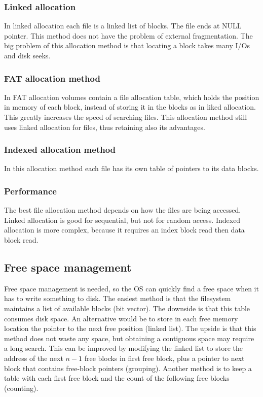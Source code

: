 
\subsubsection{Linked allocation}
In linked allocation each file is a linked list of blocks. The file ends at NULL pointer. This method does not have the problem of external fragmentation. The big problem of this allocation method is that locating a block takes many I/Os and disk seeks.


\subsubsection{FAT allocation method}
In FAT allocation volumes contain a file allocation table, which holds the position in memory of each block, instead of storing it in the blocks as in liked allocation. This greatly increases the speed of searching files. This allocation method still uses linked allocation for files, thus retaining also its advantages.

\subsubsection{Indexed allocation method}
In this allocation method each file has its own table of pointers to its data blocks.


\subsubsection{Performance}
The best file allocation method depends on how the files are being accessed. Linked allocation is good for sequential, but not for random access. Indexed allocation is more complex, because it requires an index block read then data block read.

\subsection{Free space management}
Free space management is needed, so the OS can quickly find a free space when it has to write something to disk. The easiest method is that the filesystem maintains a list of available blocks (bit vector). The downside is that this table consumes disk space. An alternative would be to store in each free memory location the pointer to the next free position (linked list). The  upside is that this method does not waste any space, but obtaining a contiguous space may require a long search. This can be improved by modifying the linked list to store the address of the next $n-1$ free blocks in first free block, plus a pointer to next block that contains free-block pointers (grouping). Another method is to keep a table with each first free block and the count of the following free blocks (counting).

